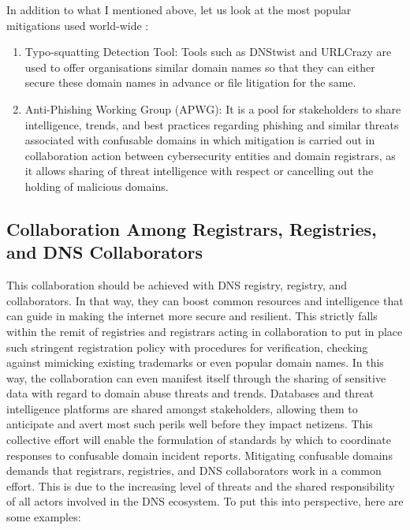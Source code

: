 In addition to what I mentioned above, let us look at the most popular mitigations used world-wide :

\begin{enumerate}
 
  \item Typo-squatting Detection Tool: Tools such as DNStwist and URLCrazy are used to offer organisations similar domain names so that they can either secure these domain names in advance or file litigation for the same.
  \item Anti-Phishing Working Group (APWG): It is a pool for stakeholders to share intelligence, trends, and best practices regarding phishing and similar threats associated with confusable domains in which mitigation is carried out in collaboration action between cybersecurity entities and domain registrars, as it allows sharing of threat intelligence with respect or cancelling out the holding of malicious domains.
\end{enumerate}

\subsection{Collaboration Among Registrars, Registries, and DNS Collaborators}

This collaboration should be achieved with DNS registry, registry, and collaborators. In that way, they can boost common resources and intelligence that can guide in making the internet more secure and resilient. This strictly falls within the remit of registries and registrars acting in collaboration to put in place such stringent registration policy with procedures for verification, checking against mimicking existing trademarks or even popular domain names. In this way, the collaboration can even manifest itself through the sharing of sensitive data with regard to domain abuse threats and trends. Databases and threat intelligence platforms are shared amongst stakeholders, allowing them to anticipate and avert most such perils well before they impact netizens. This collective effort will enable the formulation of standards by which to coordinate responses to confusable domain incident reports. Mitigating confusable domains demands that registrars, registries, and DNS collaborators work in a common effort. This is due to the increasing level of threats and the shared responsibility of all actors involved in the DNS ecosystem. \cite{Catania2022} To put this into perspective, here are some examples: 




